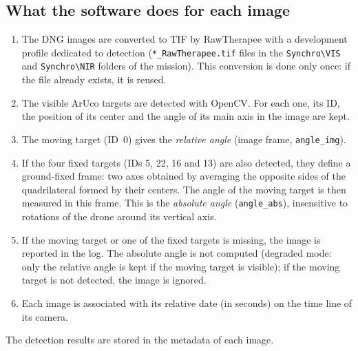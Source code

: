 \documentclass[a4paper,11pt]{report}
\begin{document}
\subsection*{What the software does for each image}
\begin{enumerate}
  \item The DNG images are converted to TIF by RawTherapee with a development profile dedicated to detection (\texttt{*\_RawTherapee.tif} files in the \texttt{Synchro\textbackslash VIS} and \texttt{Synchro\textbackslash NIR} folders of the mission). This conversion is done only once: if the file already exists, it is reused.
  \item The visible ArUco targets are detected with OpenCV. For each one, its ID, the position of its center and the angle of its main axis in the image are kept.
  \item The moving target (ID~0) gives the \emph{relative angle} (image frame, \texttt{angle\_img}).
  \item If the four fixed targets (IDs 5, 22, 16 and 13) are also detected, they define a ground-fixed frame: two axes obtained by averaging the opposite sides of the quadrilateral formed by their centers. The angle of the moving target is then measured in this frame. This is the \emph{absolute angle} (\texttt{angle\_abs}), insensitive to rotations of the drone around its vertical axis.
  \item If the moving target or one of the fixed targets is missing, the image is reported in the log. The absolute angle is not computed (degraded mode: only the relative angle is kept if the moving target is visible); if the moving target is not detected, the image is ignored.
  \item Each image is associated with its relative date (in seconds) on the time line of its camera.
\end{enumerate}
The detection results are stored in the metadata of each image.
\end{document}
